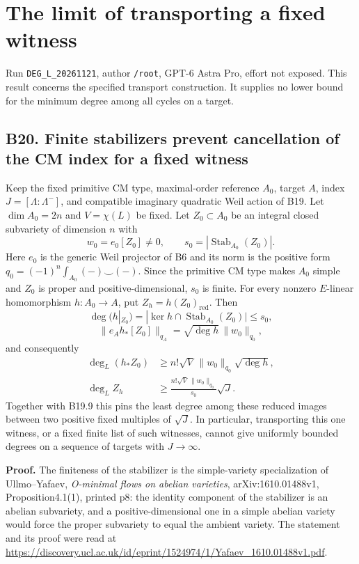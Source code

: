 \documentclass[11pt,a4paper]{article}
\theoremstyle{definition}
\begin{document}
\section{The limit of transporting a fixed witness}

Run \texttt{DEG\_L\_20261121}, author \texttt{/root}, GPT-6 Astra Pro,
effort not exposed. This result concerns the specified transport
construction. It supplies no lower bound for the minimum degree among
all cycles on a target.

\subsection{B20. Finite stabilizers prevent cancellation of the CM index
for a fixed
witness}\label{fixed-witness-transport-b20.-finite-stabilizers-prevent-cancellation-of-the-cm-index-for-a-fixed-witness}

Keep the fixed primitive CM type, maximal-order reference \(A_0\),
target \(A\), index \(J=[\Lambda:\Lambda^-]\), and compatible imaginary
quadratic Weil action of B19. Let \(\dim A_0=2n\) and \(V=\chi(L)\) be
fixed. Let \(Z_0\subset A_0\) be an integral closed subvariety of
dimension \(n\) with \[
 w_0=e_0[Z_0]\ne0,
 \qquad s_0=|\operatorname{Stab}_{A_0}(Z_0)|.
\] Here \(e_0\) is the generic Weil projector of B6 and its norm is the
positive form \(q_0=(-1)^n\int_{A_0}(-)\smile(-)\). Since the primitive
CM type makes \(A_0\) simple and \(Z_0\) is proper and
positive-dimensional, \(s_0\) is finite. For every nonzero \(E\)-linear
homomorphism \(h:A_0\to A\), put \(Z_h=h(Z_0)_{\mathrm{red}}\). Then \[
 \deg(h|_{Z_0})
   =|\ker h\cap\operatorname{Stab}_{A_0}(Z_0)|\le s_0,
\tag{B20a}
\] \[
 \|e_A h_*[Z_0]\|_{q_A}
       =\sqrt{\deg h}\,\|w_0\|_{q_0},
\tag{B20b}
\] and consequently \[
 \begin{aligned}
 \deg_L(h_*Z_0)&\ge n!\sqrt V\,\|w_0\|_{q_0}\sqrt{\deg h},\\
 \deg_L Z_h&\ge
   \frac{n!\sqrt V\,\|w_0\|_{q_0}}{s_0}\sqrt J.
 \end{aligned}
\tag{B20c}
\] Together with B19.9 this pins the least degree among these reduced
images between two positive fixed multiples of \(\sqrt J\). In
particular, transporting this one witness, or a fixed finite list of
such witnesses, cannot give uniformly bounded degrees on a sequence of
targets with \(J\to\infty\).

\textbf{Proof.} The finiteness of the stabilizer is the simple-variety
specialization of Ullmo--Yafaev, \emph{O-minimal flows on abelian
varieties}, arXiv:1610.01488v1, Proposition4.1(1), printed p8: the
identity component of the stabilizer is an abelian subvariety, and a
positive-dimensional one in a simple abelian variety would force the
proper subvariety to equal the ambient variety. The statement and its
proof were read at
\url{https://discovery.ucl.ac.uk/id/eprint/1524974/1/Yafaev_1610.01488v1.pdf}.
\end{document}
